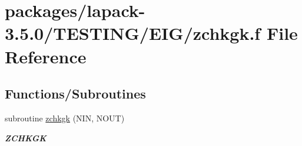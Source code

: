 \hypertarget{zchkgk_8f}{}\section{packages/lapack-\/3.5.0/\+T\+E\+S\+T\+I\+N\+G/\+E\+I\+G/zchkgk.f File Reference}
\label{zchkgk_8f}
\subsection*{Functions/\+Subroutines}
\begin{DoxyCompactItemize}
\item 
subroutine \hyperlink{group__complex16__eig_ga0aa6f942e1e31569fa01d6b77572c3f6}{zchkgk} (N\+I\+N, N\+O\+U\+T)
\begin{DoxyCompactList}\small\item\em {\bfseries Z\+C\+H\+K\+G\+K} \end{DoxyCompactList}\end{DoxyCompactItemize}
